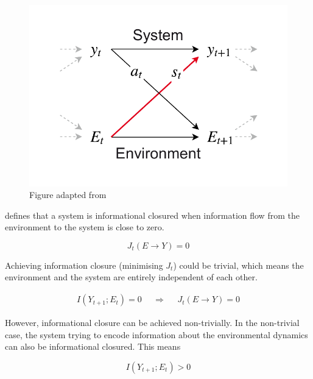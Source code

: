 \documentclass[utf8]{article}
\begin{document}
				\begin{figure}
					\includegraphics[width=\textwidth]{WritingMaterials/SystemAndEnv.pdf}
					\caption{Figure adapted from \cite{BERTSCHINGER.2006}}
					\label{fig:SystemAndEnv}
				\end{figure}


			\noindent
			\cite{BERTSCHINGER.2006} defines that a system is informational closured when information flow from the environment to the system is close to zero.

				\begin{equation}
				J_{t}(E \rightarrow Y )=0
				\end{equation}


			\noindent
			Achieving information closure (minimising $J_t$) could be trivial, which means the environment and the system are entirely independent of each other.

				\begin{equation}
				\begin{aligned}
				{I(Y_{t+1};E_{t})=0}&&{\Rightarrow}&&{J_{t}(E \rightarrow Y )=0}
				\end{aligned}
				\end{equation}


			\noindent
			However, informational closure can be achieved non-trivially. In the non-trivial case, the system trying to encode information about the environmental dynamics can also be informational closured. This means

				\begin{equation}
				I(Y_{t+1};E_{t}) > 0
				\end{equation}
\end{document}
